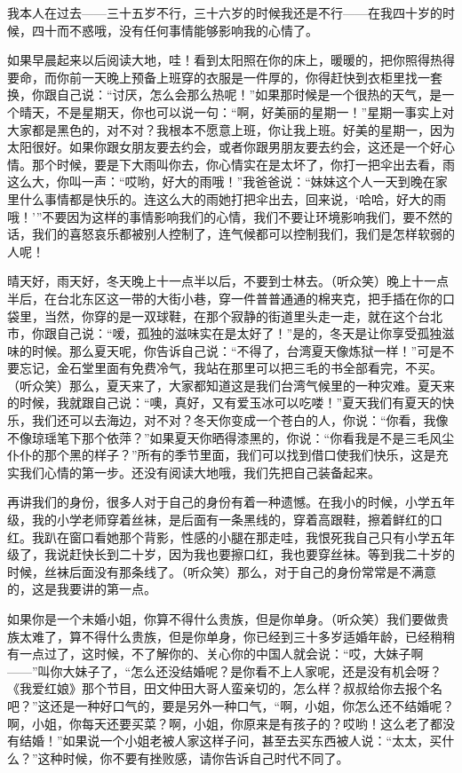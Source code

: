 \par 我本人在过去——三十五岁不行，三十六岁的时候我还是不行——在我四十岁的时候，四十而不惑哦，没有任何事情能够影响我的心情了。
\par 如果早晨起来以后阅读大地，哇！看到太阳照在你的床上，暖暖的，把你照得热得要命，而你前一天晚上预备上班穿的衣服是一件厚的，你得赶快到衣柜里找一套换，你跟自己说：“讨厌，怎么会那么热呢！”如果那时候是一个很热的天气，是一个晴天，不是星期天，你也可以说一句：“啊，好美丽的星期一！”星期一事实上对大家都是黑色的，对不对？我根本不愿意上班，你让我上班。好美的星期一，因为太阳很好。如果你跟女朋友要去约会，或者你跟男朋友要去约会，这还是一个好心情。那个时候，要是下大雨叫你去，你心情实在是太坏了，你打一把伞出去看，雨这么大，你叫一声：“哎哟，好大的雨哦！”我爸爸说：“妹妹这个人一天到晚在家里什么事情都是快乐的。连这么大的雨她打把伞出去，回来说，‘哈哈，好大的雨哦！’”不要因为这样的事情影响我们的心情，我们不要让环境影响我们，要不然的话，我们的喜怒哀乐都被别人控制了，连气候都可以控制我们，我们是怎样软弱的人呢！
\par 晴天好，雨天好，冬天晚上十一点半以后，不要到士林去。（听众笑）晚上十一点半后，在台北东区这一带的大街小巷，穿一件普普通通的棉夹克，把手插在你的口袋里，当然，你穿的是一双球鞋，在那个寂静的街道里头走一走，就在这个台北市，你跟自己说：“嗳，孤独的滋味实在是太好了！”是的，冬天是让你享受孤独滋味的时候。那么夏天呢，你告诉自己说：“不得了，台湾夏天像炼狱一样！”可是不要忘记，金石堂里面有免费冷气，我站在那里可以把三毛的书全部看完，不买。（听众笑）那么，夏天来了，大家都知道这是我们台湾气候里的一种灾难。夏天来的时候，我就跟自己说：“噢，真好，又有爱玉冰可以吃喽！”夏天我们有夏天的快乐，我们还可以去海边，对不对？冬天你变成一个苍白的人，你说：“你看，我像不像琼瑶笔下那个依萍？”如果夏天你晒得漆黑的，你说：“你看我是不是三毛风尘仆仆的那个黑的样子？”所有的季节里面，我们可以找到借口使我们快乐，这是充实我们心情的第一步。还没有阅读大地哦，我们先把自己装备起来。
\par 再讲我们的身份，很多人对于自己的身份有着一种遗憾。在我小的时候，小学五年级，我的小学老师穿着丝袜，是后面有一条黑线的，穿着高跟鞋，擦着鲜红的口红。我趴在窗口看她那个背影，性感的小腿在那走哇，我恨死我自己只有小学五年级了，我说赶快长到二十岁，因为我也要擦口红，我也要穿丝袜。等到我二十岁的时候，丝袜后面没有那条线了。（听众笑）那么，对于自己的身份常常是不满意的，这是我要讲的第一点。
\par 如果你是一个未婚小姐，你算不得什么贵族，但是你单身。（听众笑）我们要做贵族太难了，算不得什么贵族，但是你单身，你已经到三十多岁适婚年龄，已经稍稍有一点过了，这时候，不了解你的、关心你的中国人就会说：“哎，大妹子啊——”叫你大妹子了，“怎么还没结婚呢？是你看不上人家呢，还是没有机会呀？《我爱红娘》那个节目，田文仲田大哥人蛮亲切的，怎么样？叔叔给你去报个名吧？”这还是一种好口气的，要是另外一种口气，“啊，小姐，你怎么还不结婚呢？啊，小姐，你每天还要买菜？啊，小姐，你原来是有孩子的？哎哟！这么老了都没有结婚！”如果说一个小姐老被人家这样子问，甚至去买东西被人说：“太太，买什么？”这种时候，你不要有挫败感，请你告诉自己时代不同了。
